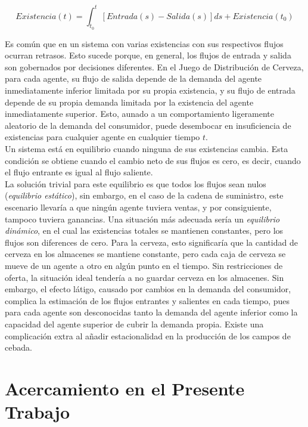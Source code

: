$$
Existencia(t) = \int_{t_{0}}^t [Entrada(s) - Salida(s)]ds + Existencia(t_{0}) 
$$

Es com\'un que en un sistema con varias existencias con sus respectivos flujos ocurran retrasos. Esto sucede porque, en general, los flujos de entrada y salida son gobernados por decisiones diferentes. En el Juego de Distribuci\'on de Cerveza, para cada agente, su flujo de salida depende de la demanda del agente inmediatamente inferior limitada por su propia existencia, y su flujo de entrada depende de su propia demanda limitada por la existencia del agente inmediatamente superior. Esto, aunado a un comportamiento ligeramente aleatorio de la demanda del consumidor, puede desembocar en insuficiencia de existencias para cualquier agente en cualquier tiempo $t$. \\

Un sistema est\'a en equilibrio cuando ninguna de sus existencias cambia. Esta condici\'on se obtiene cuando el cambio neto de sus flujos es cero, es decir, cuando el flujo entrante es igual al flujo saliente. \\

La soluci\'on trivial para este equilibrio es que todos los flujos sean nulos (\textit{equilibrio est\'atico}), sin embargo, en el caso de la cadena de suministro, este escenario llevar\'ia a que ning\'un agente tuviera ventas, y por consiguiente, tampoco tuviera ganancias. Una situaci\'on m\'as adecuada ser\'ia un \textit{equilibrio din\'amico}, en el cual las existencias totales se mantienen constantes, pero los flujos son diferences de cero. Para la cerveza, esto significar\'ia que la cantidad de cerveza en los almacenes se mantiene constante, pero cada caja de cerveza se mueve de un agente a otro en alg\'un punto en el tiempo. Sin restricciones de oferta, la situaci\'on ideal tender\'ia a no guardar cerveza en los almacenes. Sin embargo, el efecto l\'atigo, causado por cambios en la demanda del consumidor, complica la estimaci\'on de los flujos entrantes y salientes en cada tiempo, pues para cada agente son desconocidas tanto la demanda del agente inferior como la capacidad del agente superior de cubrir la demanda propia. Existe una complicaci\'on extra al a\~nadir estacionalidad en la producci\'on de los campos de cebada. \\

\section{Acercamiento en el Presente Trabajo}

